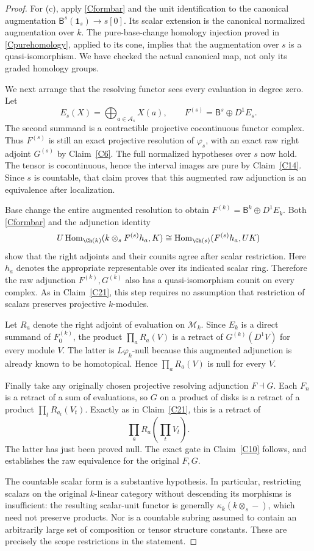 \begin{proof}
For (c), apply \eqref{Cformbar} and the unit identification to the canonical augmentation $\mathsf B^s(\mathbf1_s)\to s[0]$. Its scalar extension is the canonical normalized augmentation over $k$. The pure-base-change homology injection proved in \eqref{Cpurehomology}, applied to its cone, implies that the augmentation over $s$ is a quasi-isomorphism. We have checked the actual canonical map, not only its graded homology groups.

We next arrange that the resolving functor sees every evaluation in degree zero. Let
\[
 E_s(X)=\bigoplus_{a\in\mathcal A_s}X(a),
 \qquad
 F^{(s)}=\mathsf B^s\oplus D^1E_s.
\]
The second summand is a contractible projective cocontinuous functor complex. Thus $F^{(s)}$ is still an exact projective resolution of $\varphi_s$, with an exact raw right adjoint $G^{(s)}$ by Claim~\ref{C6}. The full normalized hypotheses over $s$ now hold. The tensor is cocontinuous, hence the interval images are pure by Claim~\ref{C14}. Since $s$ is countable, that claim proves that this augmented raw adjunction is an equivalence after localization.

Base change the entire augmented resolution to obtain $F^{(k)}=\mathsf B^k\oplus D^1E_k$. Both \eqref{Cformbar} and the adjunction identity
\[
 U\operatorname{Hom}_{\Ch(k)}
      (k\otimes_s F^{(s)}h_a,K)
 \cong
 \operatorname{Hom}_{\Ch(s)}(F^{(s)}h_a,UK)
\]
show that the right adjoints and their counits agree after scalar restriction. Here $h_a$ denotes the appropriate representable over its indicated scalar ring. Therefore the raw adjunction $F^{(k)},G^{(k)}$ also has a quasi-isomorphism counit on every complex. As in Claim~\ref{C21}, this step requires no assumption that restriction of scalars preserves projective $k$-modules.

Let $R_a$ denote the right adjoint of evaluation on $\mathcal M_k$. Since $E_k$ is a direct summand of $F^{(k)}_0$, the product $\prod_aR_a(V)$ is a retract of $G^{(k)}(D^1V)$ for every module $V$. The latter is $L\varphi_k$-null because this augmented adjunction is already known to be homotopical. Hence $\prod_aR_a(V)$ is null for every $V$.

Finally take any originally chosen projective resolving adjunction $F\dashv G$. Each $F_n$ is a retract of a sum of evaluations, so $G$ on a product of disks is a retract of a product $\prod_tR_{a_t}(V_t)$. Exactly as in Claim~\ref{C21}, this is a retract of
\[
 \prod_a R_a\!\left(\prod_tV_t\right).
\]
The latter has just been proved null. The exact gate in Claim~\ref{C10} follows, and establishes the raw equivalence for the original $F,G$.

The countable scalar form is a substantive hypothesis. In particular, restricting scalars on the original $k$-linear category without descending its morphisms is insufficient: the resulting scalar-unit functor is generally $\kappa_k(k\otimes_s-)$, which need not preserve products. Nor is a countable subring assumed to contain an arbitrarily large set of composition or tensor structure constants. These are precisely the scope restrictions in the statement.
\end{proof}
